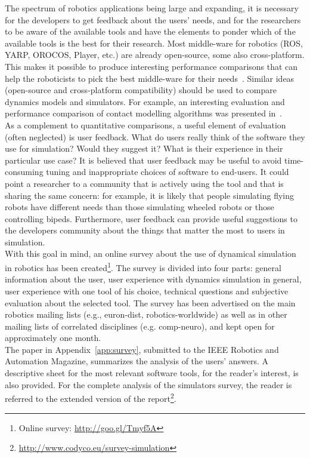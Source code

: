 \documentclass[12pt,a4paper,twoside]{article}
\newcommand{\REPORTARXIV}{\url{http://www.codyco.eu/survey-simulation}}
\begin{document}
The spectrum of robotics applications being large and expanding, it is necessary for the developers to get feedback about the users' needs, and for the researchers to be aware of the available tools and have the elements to ponder which of the available tools is the best for their research. Most middle-ware for robotics (ROS, YARP, OROCOS, Player, etc.) are already open-source, some also cross-platform. This makes it possible to produce interesting performance comparisons that can help the roboticists to pick the best middle-ware for their needs~\cite{Einhorn2012}. Similar ideas (open-source and cross-platform compatibility) should be used to compare dynamics models and simulators. For example, an interesting evaluation and performance comparison of contact modelling algorithms was presented in~\cite{Drumwright2011,Drumwright2012}.\\

As a complement to quantitative comparisons, a useful element of evaluation (often neglected) is user feedback. What do users really think of the software they use for simulation? Would they suggest it? What is their experience in their particular use case? It is believed that user feedback may be useful to avoid time-consuming tuning and inappropriate choices of software to end-users. It could point a researcher to a community that is actively using the tool and that is sharing the same concern: for example, it is likely that people simulating flying robots have different needs than those simulating wheeled robots or those controlling bipeds. Furthermore, user feedback can provide useful suggestions to the developers community about the things that matter the most to users in simulation.\\

With this goal in mind, an online survey about the use of dynamical simulation in robotics has been created\footnote{Online survey: \url{http://goo.gl/Tmyf5A}}.
The survey is divided into four parts: general information about the user, user experience with dynamics simulation in general, user experience with one tool of his choice, technical questions and subjective evaluation about the selected tool. The survey has been advertised on the main robotics mailing lists (e.g., euron-dist, robotics-worldwide) as well as in other mailing lists of correlated disciplines (e.g. comp-neuro), and kept open for approximately one month.\\

The paper in Appendix~\ref{app:survey}, submitted to the IEEE Robotics and Automation Magazine, summarizes the analysis of the users' answers. A descriptive sheet for the most relevant software tools, for the reader's interest, is also provided. For the complete analysis of the simulators survey, the reader is referred to the extended version of the report\footnote{\REPORTARXIV}.\\
\end{document}
